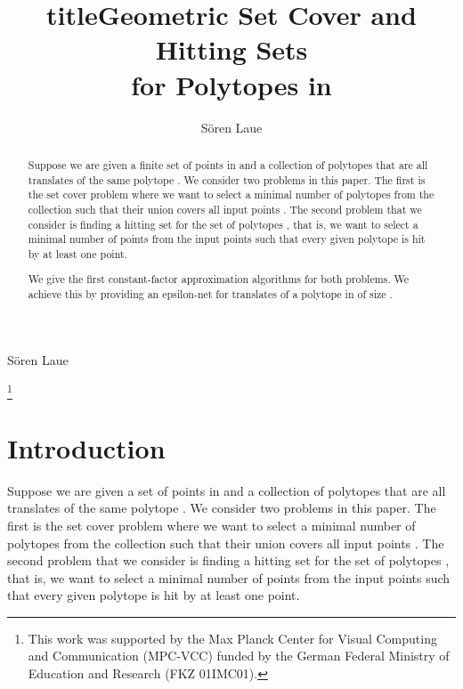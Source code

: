 \documentclass{stacs_proc}
\begin{document}
\title[short title]{title}
\title[Geometric Set Cover and Hitting Sets for Polytopes in ]{Geometric Set
  Cover and Hitting Sets \\ for Polytopes in }


\author{S\"{o}ren Laue}{S\"{o}ren Laue}
\address{Max-Planck-Institut f\"{u}r Informatik, Campus E1 4, 66123
Saarbr\"{u}cken, Germany}    \thanks{This work was supported by the Max Planck Center for Visual
  Computing and Communication (MPC-VCC) funded by the German Federal
  Ministry of Education and Research (FKZ 01IMC01).} 








\begin{abstract}
  \noindent 
  Suppose we are given a finite set of points  in  and a
  collection of polytopes  that are all translates of the same
  polytope . We consider two problems in this paper. The first is
  the set cover problem where we want to select a minimal number of
  polytopes from the collection  such that their union covers all
  input points . The second problem that we consider is finding a
  hitting set for the set of polytopes , that is, we want to
  select a minimal number of points from the input points  such
  that every given polytope is hit by at least one point.
  
  We give the first constant-factor approximation algorithms for both
  problems. 
  We achieve this by providing an epsilon-net for translates of a
  polytope in  of size . 
\end{abstract}

\maketitle





\vspace{-0.5cm}
\section*{Introduction}\label{S:one}
Suppose we are given a set of  points  in  and a collection
of polytopes  that are all translates of the same polytope . We
consider two problems in this paper. The first is the set cover
problem where we want to select a minimal number of polytopes from the
collection  such that their union covers all input points . The
second problem that we consider is finding a hitting set for the set
of polytopes , that is, we want to select a minimal number of
points from the input points  such that every given polytope is hit
by at least one point.   
\end{document}
